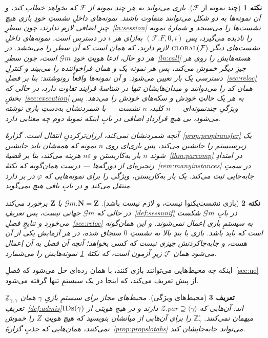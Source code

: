 \documentclass[10pt,oneside,openany]{book}
\newcommand{\admits}{\mathbf{N}}
\newcommand{\Zpid}{\mathbf{Z}}
\newcommand{\pars}{\mathit{par}}
\newcommand{\F}{\mathcal{F}}
\newcommand{\Zenv}{\mathcal{Z}}
\newcommand{\ZenvSet}{\mathbb{Z}}
\newcommand{\op}[1]{\textnormal{\textsc{#1}}}
\newcommand{\IDs}{\op{IDs}}
\newcommand{\Gm}{\mathcal{G}m}
\newcommand{\ncl}[1]{\langle #1 \rangle}
\theoremstyle{accentdef}
\newtheorem{definition}{تعریف}[chapter]
\newtheorem{remark}[definition]{نکته}
\theoremstyle{accentplain}
\begin{document}
\begin{remark}[چند نمونه از $\F$]\label{rem:gminstances}
بازی می‌تواند به هر چند نمونه از $\F$ که بخواهد خطاب کند، و آن نمونه‌ها به
دو شکل می‌توانند متفاوت باشند. نمونه‌های داخلِ نشستِ خودِ بازی هیچ چیزِ
اضافی لازم ندارند، چون سطرِ~\ref{ln:session} نشست‌ها را می‌سنجد و شمارهٔ
نمونه را نادیده می‌گیرد، پس $(\F.F,0,i)$ به‌ازای هر $i$ در دسترس است.
نمونه‌های داخلِ نشست‌های دیگر $\op{global}(\F)$ لازم دارند، که همان است که
آن سطر را می‌بخشد. در هر دو حال، ادعا هویتِ خودِ $\Gm$ است، چون
سطرِ~\ref{ln:call} هسته‌هایش را روی هر چیزِ دیگر خموش می‌کند، پس هر نمونه
یک و همان فراخواننده را می‌بیند و کنترلِ دسترسی یک بار تعیین می‌شود. و آن
نمونه‌ها واقعاً رونوشتند: بنا بر فصلِ~\ref{sec:reloc} همان کد را می‌دوانند
و میدان‌هایشان تنها در شناسهٔ فرایند تفاوت دارد، در حالی که
بخشِ~\ref{sec:execution} به هر یک حالتِ خودش و سکه‌های خودش را می‌دهد. پس
ویژگیِ چندنمونه‌ای --- $n$ کلید، $n$ نشست --- با شمردنشان به‌دستِ بازی نوشته
می‌شود، بی هیچ قراردادِ اضافی در بابِ اینکه نمونهٔ دوم چه معنایی دارد.

آنچه شمردنشان نمی‌کند، ارزان‌ترکردنِ انتقال است.
گزارهٔ~\ref{prop:proptransfer} یک زیرسیستم را جانشین می‌کند، پس بازی‌ای روی
$n$ نمونه که همه‌شان باید جانشین شوند $n$ بار به‌کاربستن و $n\varepsilon$
هزینه می‌کند، بنا بر قضیهٔ~\ref{thm:parcomp} در امتدادِ زنجیره‌ای از
دورگه‌ها --- درست همان‌گونه که نکتهٔ~\ref{rem:manyinstances} در سمتِ
جابه‌جایی ثبت می‌کند. یک بار به‌کاربستن، ویژگی را برای نمونه‌هایی که
$\varphi$ در بر دارد منتقل می‌کند و در بابِ باقی هیچ نمی‌گوید.
\end{remark}

\begin{remark}[بازی نشست‌یکنوا نیست، و لازم نیست باشد]\label{rem:gmsessunif}
$\Gm.\admits = \Zpid$ با $\Zpid$ برخورد می‌کند در حالی که $\Gm$ جهانی
نیست، پس تعریفِ~\ref{def:sessunif} در بابِ $\Gm$ شکست می‌خورد و نتایجِ
فصلِ~\ref{sec:reloc} به سیستمِ بازی اِعمال نمی‌شوند. و این همان‌گونه است که
باید باشد. بازی با بندِ بالا به نشستِ $0$ سنجاق شده، در هر آزمایش یکی از
آن هست، و جابه‌جاکردنش چیزی نیست که کسی بخواهد؛ آنچه آن فصل به آن اِعمال
می‌شود همان $\F$ِ زیرِ آزمون است، که
نکتهٔ~\ref{rem:gminstances} نمونه‌هایش را می‌شمارد.
\end{remark}

اینکه چه محیط‌هایی می‌توانند بازی کنند، با همان رده‌ای حل می‌شود که
فصلِ~\ref{sec:uc} از پیش تعریف می‌کند، که اینجا در یک سیستمِ تنها گرفته
می‌شود.

\begin{definition}[محیط‌های ویژگی]\label{def:propenv}
محیط‌های \emph{مجاز برای} سیستمِ بازیِ $\gamma$ همان
$\ZenvSet_{\gamma,\gamma}$ِ تعریفِ~\ref{def:admis}اند: آن‌هایی که
$\Zenv.\pars \supseteq \ncl{\gamma}$ دارند و در هیچ هویتی از $\IDs(\gamma)$
میهمان نمی‌کنند. $\ZenvSet^{\circ}_{\gamma}$ را برای آن‌هایی از میانشان
بنویسید که هیچ هویتِ $Z$ را خموش نمی‌کنند، همان‌هایی که جذبِ
گزارهٔ~\ref{prop:propslotabs} می‌تواند جابه‌جایشان کند.
\end{definition}
\end{document}
